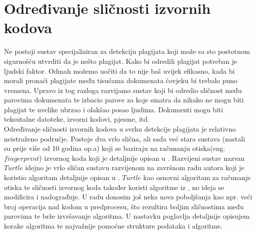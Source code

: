 \chapter{Određivanje sličnosti izvornih kodova}

Ne postoji sustav specijaliziran za detekciju plagijata koji može sa sto postotnom sigurnošću utvrditi da je nešto plagijat. Kako bi odredili plagijat potreban je ljudski faktor.  Odmah možemo uočiti da to nije baš uvijek efikasno, kada bi morali pronaći plagijate među tisućama dokumenata čovjeku bi trebalo puno vremena. Upravo iz tog razloga razvijamo sustav koji bi odredio sličnost među parovima dokumenata te izbacio parove za koje smatra da nikako ne mogu biti plagijat te uvelike ubrzao i olakšao posao ljudima. Dokumenti mogu biti teksutalne datoteke, izvorni kodovi, pjesme, itd. \\
	
	Određivanje sličnosti izvornih kodova u svrhu detekcije plagijata je relativno neistraženo područje. Postoje dva vrlo slična, ali sada već stara sustava (nastali su prije više od 10 godina op.a)  \cite{moss} \cite{jplag} koji se baziraju na računanju otiska(eng. $fingerprint$) izvornog koda koji je detaljnije opisan u \cite{winnowing}. Razvijeni sustav nazvan $Turtle$ idejno je vrlo sličan sustavu razvijenom na završnom radu autora \cite{plagijator} koji je koristio algoritam detaljnije opisan u \cite{dorian}. $Turtle$ kao osnovni algoritam za računanje otiska te sličnosti izvornog koda također koristi algoritme iz \cite{winnowing}, no ideja se modificira i nadograđuje. U radu donosim još neka nova poboljšanja kao npr. veći broj operacija nad kodom u predprocesu, što rezultira boljim sličnostima među parovima te brže izvršavanje algoritma. U nastavku poglavlja detaljnije opisujem korake algoritma te najvažnije pomoćne strukture podataka i algoritme. 	